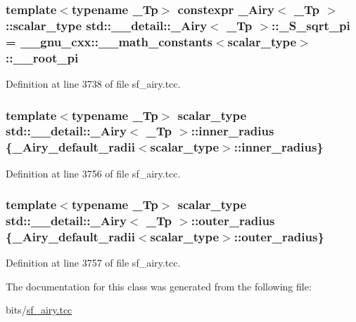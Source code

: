 \subsubsection[{\texorpdfstring{\+\_\+\+S\+\_\+sqrt\+\_\+pi}{_S_sqrt_pi}}]{\setlength{\rightskip}{0pt plus 5cm}template$<$typename \+\_\+\+Tp$>$ constexpr {\bf \+\_\+\+Airy}$<$ \+\_\+\+Tp $>$\+::{\bf scalar\+\_\+type} {\bf std\+::\+\_\+\+\_\+detail\+::\+\_\+\+Airy}$<$ \+\_\+\+Tp $>$\+::\+\_\+\+S\+\_\+sqrt\+\_\+pi = \+\_\+\+\_\+gnu\+\_\+cxx\+::\+\_\+\+\_\+math\+\_\+constants$<${\bf scalar\+\_\+type}$>$\+::\+\_\+\+\_\+root\+\_\+pi\hspace{0.3cm}{\ttfamily [static]}}\hypertarget{classstd_1_1____detail_1_1__Airy_abee18aba33b66386e818da9c7f4eeff4}{}\label{classstd_1_1____detail_1_1__Airy_abee18aba33b66386e818da9c7f4eeff4}


Definition at line 3738 of file sf\+\_\+airy.\+tcc.

\subsubsection[{\texorpdfstring{inner\+\_\+radius}{inner_radius}}]{\setlength{\rightskip}{0pt plus 5cm}template$<$typename \+\_\+\+Tp$>$ {\bf scalar\+\_\+type} {\bf std\+::\+\_\+\+\_\+detail\+::\+\_\+\+Airy}$<$ \+\_\+\+Tp $>$\+::inner\+\_\+radius \{{\bf \+\_\+\+Airy\+\_\+default\+\_\+radii}$<${\bf scalar\+\_\+type}$>$\+::inner\+\_\+radius\}}\hypertarget{classstd_1_1____detail_1_1__Airy_ae619970f4c54b7f80340f05b7ead83e1}{}\label{classstd_1_1____detail_1_1__Airy_ae619970f4c54b7f80340f05b7ead83e1}


Definition at line 3756 of file sf\+\_\+airy.\+tcc.

\subsubsection[{\texorpdfstring{outer\+\_\+radius}{outer_radius}}]{\setlength{\rightskip}{0pt plus 5cm}template$<$typename \+\_\+\+Tp$>$ {\bf scalar\+\_\+type} {\bf std\+::\+\_\+\+\_\+detail\+::\+\_\+\+Airy}$<$ \+\_\+\+Tp $>$\+::outer\+\_\+radius \{{\bf \+\_\+\+Airy\+\_\+default\+\_\+radii}$<${\bf scalar\+\_\+type}$>$\+::outer\+\_\+radius\}}\hypertarget{classstd_1_1____detail_1_1__Airy_af688e5d14ed305f95f0e9d9d58d3bf9a}{}\label{classstd_1_1____detail_1_1__Airy_af688e5d14ed305f95f0e9d9d58d3bf9a}


Definition at line 3757 of file sf\+\_\+airy.\+tcc.



The documentation for this class was generated from the following file\+:\begin{DoxyCompactItemize}
\item 
bits/\hyperlink{sf__airy_8tcc}{sf\+\_\+airy.\+tcc}\end{DoxyCompactItemize}
